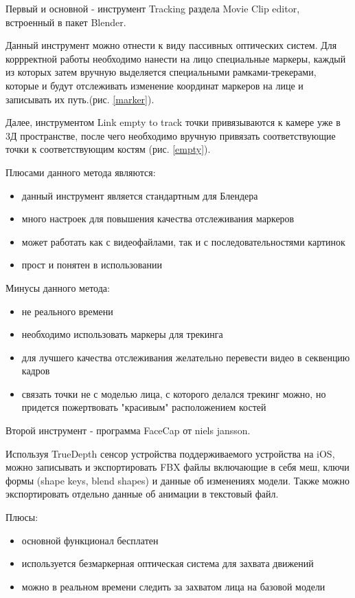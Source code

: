 Первый и основной - инструмент Tracking раздела Movie Clip editor, встроенный в пакет Blender.

Данный инструмент можно отнести к виду пассивных оптических систем. Для коррректной работы необходимо нанести на лицо специальные маркеры, каждый из которых затем вручную выделяется специальными рамками-трекерами, которые и будут отслеживать изменение координат маркеров на лице и записывать их путь.(рис. \ref{marker}).

Далее, инструментом Link empty to track точки привязываются к камере уже в 3Д пространстве, после чего необходимо вручную привязать соответствующие точки к соответствующим костям (рис. \ref{empty}).

Плюсами данного метода являются:
\begin{itemize}
	\item данный инструмент является стандартным для Блендера
	\item много настроек для повышения качества отслеживания маркеров
	\item может работать как с видеофайлами, так и с последовательностями картинок
	\item прост и понятен в использовании
\end{itemize}
Минусы данного метода:
\begin{itemize}
	\item не реального времени
	\item необходимо использовать маркеры для трекинга
	\item для лучшего качества отслеживания желательно перевести видео в секвенцию кадров
	\item связать точки не с моделью лица, с которого делался трекинг можно, но придется пожертвовать "красивым" расположением костей
\end{itemize}

Второй инструмент - программа FaceCap от niels jansson. 

Используя TrueDepth сенсор устройства поддерживаемого устройства на iOS, можно записывать и экспортировать FBX файлы включающие в себя меш, ключи формы (shape keys, blend shapes) и данные об изменениях модели. Также можно экспортировать отдельно данные об анимации в текстовый файл.

Плюсы:
\begin{itemize}
	\item основной функционал бесплатен
	\item используется безмаркерная оптическая система для захвата движений
	\item можно в реальном времени следить за захватом лица на базовой модели
\end{itemize}

